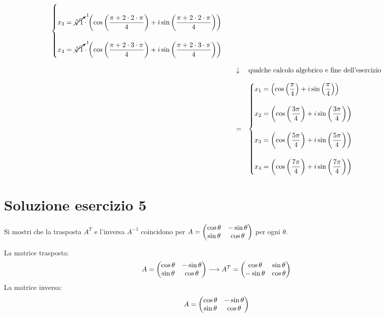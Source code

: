 \documentclass[a4paper]{article}
\makeatletter
\newenvironment{rowequmat}[1]{\left(\array{@{}#1@{}}}{\endarray\right)}
\makeatother
\begin{document}
\begin{equation*}
\begin{array}{rll}
\begin{cases}
				\\
				x_{3} = \cancelto{1}{\sqrt[4]{1}} \cdot \left(\cos\left(\dfrac{\pi + 2 \cdot 2 \cdot \pi}{4}\right) + i \sin\left(\dfrac{\pi + 2 \cdot 2 \cdot \pi}{4}\right)\right)\\
				\\
				x_{4} = \cancelto{1}{\sqrt[4]{1}} \cdot \left(\cos\left(\dfrac{\pi + 2 \cdot 3 \cdot \pi}{4}\right) + i \sin\left(\dfrac{\pi + 2 \cdot 3 \cdot \pi}{4}\right)\right)
			\end{cases} \\
			\\
			& \downarrow & \text{qualche calcolo algebrico e fine dell'esercizio} \\
			\\
			& = & \begin{cases}
				x_{1} = \left(\cos\left(\dfrac{\pi}{4}\right) + i \sin\left(\dfrac{\pi}{4}\right)\right)\\
				\\
				x_{2} = \left(\cos\left(\dfrac{3\pi}{4}\right) + i \sin\left(\dfrac{3\pi}{4}\right)\right)\\
				\\
				x_{3} = \left(\cos\left(\dfrac{5\pi}{4}\right) + i \sin\left(\dfrac{5\pi}{4}\right)\right)\\
				\\
				x_{4} = \left(\cos\left(\dfrac{7\pi}{4}\right) + i \sin\left(\dfrac{7\pi}{4}\right)\right)
			\end{cases}
		\end{array}
	\end{equation*}\newpage

	\section{Soluzione esercizio 5}
	
	Si mostri che la trasposta $A^{T}$ e l'inversa $A^{-1}$ coincidono per $A = \begin{rowequmat}{cc}
		\cos\theta & -\sin\theta \\
		\sin\theta & \cos\theta
	\end{rowequmat}$ per ogni $\theta$.\newline

	\noindent
	La matrice trasposta:
	\begin{equation*}
		A = \begin{rowequmat}{cc}
			\cos\theta & -\sin\theta \\
			\sin\theta & \cos\theta
		\end{rowequmat} \longrightarrow
		A^{T} = \begin{rowequmat}{cc}
			\cos\theta & \sin\theta \\
			-\sin\theta & \cos\theta
		\end{rowequmat}
	\end{equation*}
	La matrice inversa:
	\begin{equation*}
		A = \begin{rowequmat}{cc}
			\cos\theta & -\sin\theta \\
			\sin\theta & \cos\theta
		\end{rowequmat}
	\end{equation*}
\end{document}

